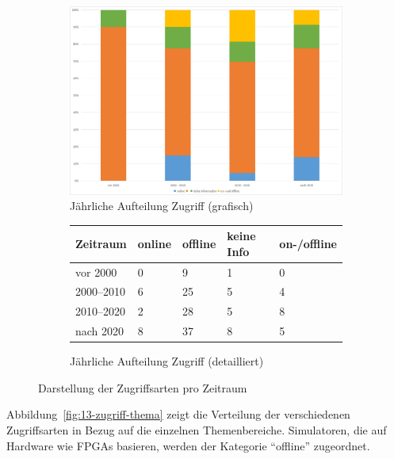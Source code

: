 \begin{figure}[!htbp]
    \centering
    \begin{subfigure}[b]{0.48\textwidth}
        \centering
        \includegraphics[width=\textwidth]{graphics/12-zugriff-jahr.png}
        \caption{Jährliche Aufteilung Zugriff (grafisch)}
        \label{fig:12-zugriff-jahr}
    \end{subfigure}
    \hfill
    \begin{subfigure}[b]{0.48\textwidth}
        \centering
        \tiny
        \begin{tabularx}{\textwidth}{lXXXX}
            \hline
            \textbf{Zeitraum} & \textbf{online} & \textbf{offline} & \textbf{keine Info} & \textbf{on-/offline} \\
            \hline
            vor 2000      & 0  & 9  & 1 & 0 \\
            2000--2010    & 6  & 25 & 5 & 4 \\
            2010--2020    & 2  & 28 & 5 & 8 \\
            nach 2020     & 8  & 37 & 8 & 5 \\
            \hline
        \end{tabularx}
        \caption{Jährliche Aufteilung Zugriff (detailliert)}
        \label{tab:zugriff-zeit}
    \end{subfigure}
    \caption{Darstellung der Zugriffsarten pro Zeitraum}
    \label{fig:zugriff-gesamt}
\end{figure}

Abbildung~\ref{fig:13-zugriff-thema} zeigt die Verteilung der verschiedenen Zugriffsarten in Bezug auf die einzelnen Themenbereiche. Simulatoren, die auf Hardware wie \ac{FPGA}s basieren, werden der Kategorie \enquote{offline} zugeordnet.

